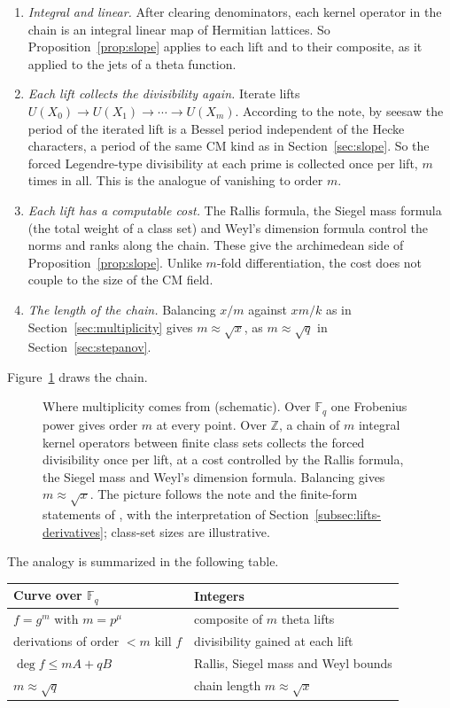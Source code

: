 \documentclass[11pt]{amsbook}
\theoremstyle{plain}
\theoremstyle{definition}
\theoremstyle{remark}
\numberwithin{equation}{section}
\numberwithin{figure}{chapter}
\numberwithin{table}{chapter}
\newcommand{\Z}{\mathbb{Z}}
\newcommand{\F}{\mathbb{F}}
\begin{document}
\begin{enumerate}[label=(\roman*)]
\item \emph{Integral and linear.} After clearing denominators, each
kernel operator in the chain is an integral linear map of Hermitian
lattices. So Proposition~\ref{prop:slope} applies to each lift and
to their composite, as it applied to the jets of a theta function.
\item \emph{Each lift collects the divisibility again.} Iterate
lifts $U(X_0) \to U(X_1) \to \cdots \to U(X_m)$. According to the
note, by seesaw the period of the iterated lift is a Bessel period
independent of the Hecke characters, a period of the same CM kind
as in Section~\ref{sec:slope}. So the forced Legendre-type
divisibility at each prime is collected once per lift, $m$ times in
all. This is the analogue of vanishing to order $m$.
\item \emph{Each lift has a computable cost.} The Rallis formula,
the Siegel mass formula (the total weight of a class set) and
Weyl's dimension formula control the norms and ranks along the
chain. These give the archimedean side of
Proposition~\ref{prop:slope}. Unlike $m$-fold differentiation, the
cost does not couple to the size of the CM field.
\item \emph{The length of the chain.} Balancing $x/m$ against
$xm/k$ as in Section~\ref{sec:multiplicity} gives
$m \approx \sqrt x$, as $m \approx \sqrt q$ in
Section~\ref{sec:stepanov}.
\end{enumerate}
Figure~\ref{fig:theta-chain} draws the chain.
\begin{figure}[tbp]
\centering
{}
\caption{Where multiplicity comes from (schematic). Over $\F_q$ one
Frobenius power gives order $m$ at every point. Over $\Z$, a chain
of $m$ integral kernel operators between finite class sets collects
the forced divisibility once per lift, at a cost controlled by the
Rallis formula, the Siegel mass and Weyl's dimension formula.
Balancing gives $m\approx\sqrt x$. The picture follows the note
\cite{AlpogeRemark2026} and the finite-form statements of
\cite{AlpogeArchive2026}, with the interpretation of
Section~\ref{subsec:lifts-derivatives}; class-set sizes are
illustrative.}
\label{fig:theta-chain}
\end{figure}

The analogy is summarized in the following table.
\begin{center}
\begin{tabular}{@{}ll@{}}
\toprule
Curve over $\F_q$ & Integers \\
\midrule
$f = g^m$ with $m = p^\mu$ & composite of $m$ theta lifts \\
derivations of order $< m$ kill $f$
  & divisibility gained at each lift \\
$\deg f \le mA + qB$ & Rallis, Siegel mass and Weyl bounds \\
$m \approx \sqrt q$ & chain length $m \approx \sqrt x$ \\
\bottomrule
\end{tabular}
\end{center}
\end{document}

